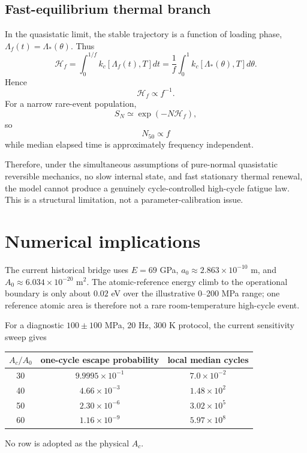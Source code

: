 \documentclass[11pt]{article}
\begin{document}
\subsection{Fast-equilibrium thermal branch}
In the quasistatic limit, the stable trajectory is a function of loading phase, $\Lambda_f(t)=\Lambda_*(\theta)$. Thus
\begin{equation}
\mathcal H_f
=\int_0^{1/f}k_c[\Lambda_f(t),T]dt
=\frac1f\int_0^1k_c[\Lambda_*(\theta),T]d\theta.
\end{equation}
Hence
\begin{equation}
\boxed{\mathcal H_f\propto f^{-1}.}
\label{eq:freq}
\end{equation}
For a narrow rare-event population,
\begin{equation}
S_N\simeq\exp(-N\mathcal H_f),
\end{equation}
so
\begin{equation}
\boxed{N_{50}\propto f}
\end{equation}
while median elapsed time is approximately frequency independent.

Therefore, under the simultaneous assumptions of pure-normal quasistatic reversible mechanics, no slow internal state, and fast stationary thermal renewal, the model cannot produce a genuinely cycle-controlled high-cycle fatigue law. This is a structural limitation, not a parameter-calibration issue.

\section{Numerical implications}
The current historical bridge uses $E=69$ GPa, $a_0\approx2.863\times10^{-10}$ m, and $A_0\approx6.034\times10^{-20}$ m$^2$. The atomic-reference energy climb to the operational boundary is only about $0.02$ eV over the illustrative 0--200 MPa range; one reference atomic area is therefore not a rare room-temperature high-cycle event.

For a diagnostic $100\pm100$ MPa, 20 Hz, 300 K protocol, the current sensitivity sweep gives
\begin{center}
\begin{tabular}{ccc}
\toprule
$A_c/A_0$ & one-cycle escape probability & local median cycles \\
\midrule
30 & $9.9995\times10^{-1}$ & $7.0\times10^{-2}$ \\
40 & $4.66\times10^{-3}$ & $1.48\times10^{2}$ \\
50 & $2.30\times10^{-6}$ & $3.02\times10^{5}$ \\
60 & $1.16\times10^{-9}$ & $5.97\times10^{8}$ \\
\bottomrule
\end{tabular}
\end{center}
No row is adopted as the physical $A_c$.
\end{document}
